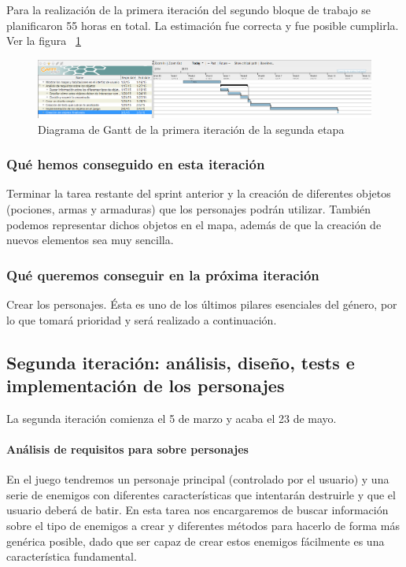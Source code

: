 Para la realización de la primera iteración del segundo bloque de trabajo se planificaron 55 horas en total. La estimación fue correcta y fue posible cumplirla. Ver la figura ~\ref{fig:sec2it1}

\begin{figure}
    \includegraphics[width=\textwidth,height=\textheight,keepaspectratio]{./img/sec2it1.png}
  \caption{Diagrama de Gantt de la primera iteración de la segunda etapa}
  \label{fig:sec2it1}
\end{figure}

\subsubsection{Qué hemos conseguido en esta iteración}

Terminar la tarea restante del sprint anterior y la creación de diferentes objetos (pociones, armas y armaduras) que los personajes podrán utilizar. También podemos representar dichos objetos en el mapa, además de que la creación de nuevos elementos sea muy sencilla.

\subsubsection{Qué queremos conseguir en la próxima iteración}

Crear los personajes. Ésta es uno de los últimos pilares esenciales del género, por lo que tomará prioridad y será realizado a continuación.

\subsection{Segunda iteración: análisis, diseño, tests e implementación de los personajes}

La segunda iteración comienza el 5 de marzo y acaba el 23 de mayo.

\paragraph{Análisis de requisitos para sobre personajes} En el juego tendremos un personaje principal (controlado por el usuario) y una serie de enemigos con diferentes características que intentarán destruirle y que el usuario deberá de batir. En esta tarea nos encargaremos de buscar información sobre el tipo de enemigos a crear y diferentes métodos para hacerlo de forma más genérica posible, dado que ser capaz de crear estos enemigos fácilmente es una característica fundamental.

